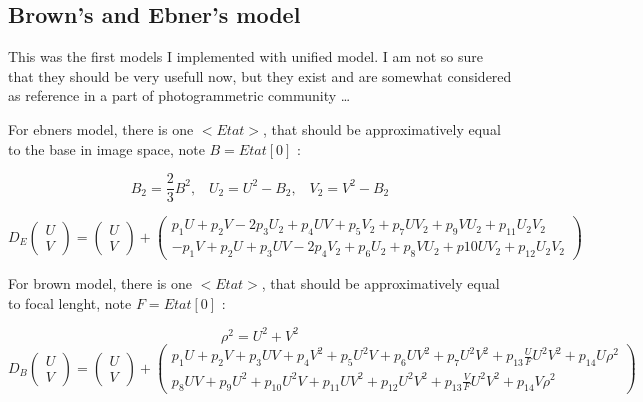 \subsection{Brown's and Ebner's model}


This was the first models I implemented with unified model. I am not so sure that they
should be very usefull now, but they exist and are somewhat considered as reference in a part
of photogrammetric community \dots


For ebners model, there is one $<Etat>$, that should be  approximatively equal to the base in image space,
note $B=Etat[0]$ :

\begin{equation}
     B_2 = \frac{2}{3} B^2 
    ,\;\;\;   U_2 = U^2 - B_2
    ,\;\;\;   V_2 = V^2 - B_2
\end{equation}


\begin{equation}
  D_E \begin{pmatrix}  U \\  V  \end{pmatrix} =
      \begin{pmatrix}  U \\  V  \end{pmatrix}
   +  \begin{pmatrix}  
              p_1 U + p_2 V -2p_3 U_2 + p_4 UV +p_5 V_2 +p_7 UV_2 +p_9 VU_2    + p_{11} U_2 V_2   \\ 
              -p_1V + p_2 U + p_3 UV  -2p_4V_2 +p_6 U_2 +p_8 V U_2+p{10} UV_2  + p_{12} U_2 V_2
       \end{pmatrix}
\end{equation}

 
For brown model, there is one $<Etat>$, that should be approximatively equal to focal lenght,
note $F=Etat[0]$ :

\begin{equation}
      \rho^2 =  U^2 + V^2
\end{equation}
\begin{equation}
  D_B \begin{pmatrix}  U \\  V  \end{pmatrix} =
      \begin{pmatrix}  U \\  V  \end{pmatrix}
   +  \begin{pmatrix}  
              p_1 U + p_2 V  + p_3 UV + p_4 V^2 + p_5 U^2 V + p_6 UV^2 + p_7 U^2V^2 + p_{13}\frac{U}{F}U^2V^2 + p_{14} U \rho^2   \\
              p_8 UV + p_9 U^2 +p_{10}U^2V + p_{11}UV^2 + p_{12} U^2V^2 + p_{13}\frac{V}{F}U^2V^2 +  p_{14} V \rho^2
       \end{pmatrix}
\end{equation}



